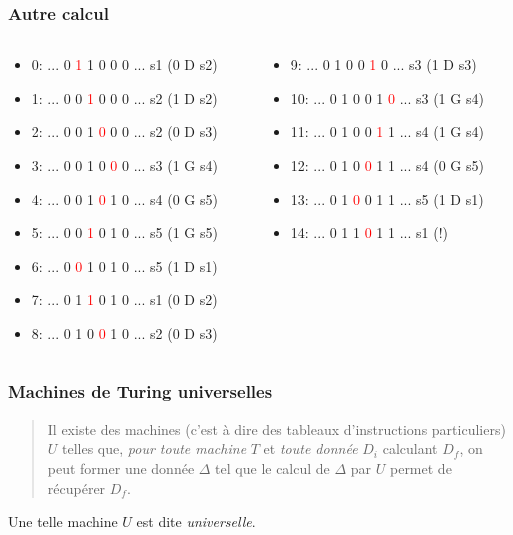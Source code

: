 \begin{frame}
  \frametitle{Autre calcul}
\begin{columns}
  \begin{column}{6cm}
    \begin{itemize}
     \pause \item 0: ... 0 \textcolor{red}{1} 1 0 0 0 ... s1 (0 D s2)
     \pause \item 1: ... 0 0 \textcolor{red}{1} 0 0 0 ... s2 (1 D s2)
     \pause \item 2: ... 0 0 1 \textcolor{red}{0} 0 0 ... s2 (0 D s3)
     \pause \item 3: ... 0 0 1 0 \textcolor{red}{0} 0 ... s3 (1 G s4)
     \pause \item 4: ... 0 0 1 \textcolor{red}{0} 1 0 ... s4 (0 G s5)
     \pause \item 5: ... 0 0 \textcolor{red}{1} 0 1 0 ... s5 (1 G s5)
     \pause \item 6: ... 0 \textcolor{red}{0} 1 0 1 0 ... s5 (1 D s1)
     \pause \item 7: ... 0 1 \textcolor{red}{1} 0 1 0 ... s1 (0 D s2)
     \pause \item 8: ... 0 1 0 \textcolor{red}{0} 1 0 ... s2 (0 D s3)
    \end{itemize}
  \end{column}

  \begin{column}{6.5cm}
  \begin{itemize}
    \pause \item 9: ... 0 1 0 0 \textcolor{red}{1} 0 ... s3 (1 D s3)
    \pause \item 10: ... 0 1 0 0 1 \textcolor{red}{0} ... s3 (1 G s4)
    \pause \item 11: ... 0 1 0 0 \textcolor{red}{1} 1 ... s4 (1 G s4)
    \pause \item 12: ... 0 1 0 \textcolor{red}{0} 1 1 ... s4 (0 G s5)
    \pause \item 13: ... 0 1 \textcolor{red}{0} 0 1 1 ... s5 (1 D s1)
    \pause \item 14: ... 0 1 1 \textcolor{red}{0} 1 1 ... s1 (!)
  \end{itemize}
  \end{column}
\end{columns}
\end{frame}

\begin{frame}
  \frametitle{Machines de Turing universelles}
\begin{quotation}
  Il existe des machines (c'est à dire des tableaux d'instructions particuliers) $U$ telles que, \emph{pour toute machine} $T$ et \emph{toute donnée} $D_i$ calculant $D_f$, on peut former une donnée $\Delta$ tel que le calcul de $\Delta$ par $U$ permet de récupérer $D_f$.
\end{quotation} 
Une telle machine $U$ est dite \emph{universelle}.
\end{frame}

